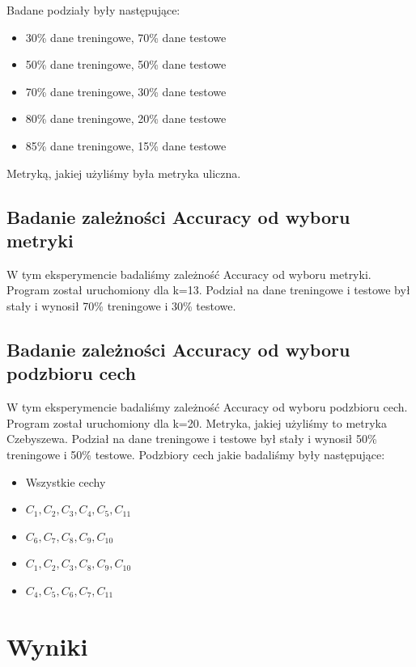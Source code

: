 \documentclass{classrep}
\begin{document}
Badane podziały były następujące:
\begin{itemize}
	\item 30\% dane treningowe, 70\% dane testowe
	\item 50\% dane treningowe, 50\% dane testowe
	\item 70\% dane treningowe, 30\% dane testowe
	\item 80\% dane treningowe, 20\% dane testowe
	\item 85\% dane treningowe, 15\% dane testowe
\end{itemize}

Metryką, jakiej użyliśmy była metryka uliczna.

\subsection{Badanie zależności Accuracy od wyboru metryki}

W tym eksperymencie badaliśmy zależność Accuracy od wyboru metryki. Program został uruchomiony dla k=13. Podział na dane treningowe i testowe był stały i wynosił 70\% treningowe i 30\% testowe.

\subsection{Badanie zależności Accuracy od wyboru podzbioru cech}

W tym eksperymencie badaliśmy zależność Accuracy od wyboru podzbioru cech. Program został uruchomiony dla k=20. Metryka, jakiej użyliśmy to metryka Czebyszewa. Podział na dane treningowe i testowe był stały i wynosił 50\% treningowe i 50\% testowe. Podzbiory cech jakie badaliśmy były następujące:
\begin{itemize}
	\item Wszystkie cechy
	\item $C_1, C_2, C_3, C_4, C_5, C_{11}$
	\item $C_6, C_7, C_8, C_9, C_{10}$ 
	\item $C_1, C_2, C_3, C_8, C_9, C_{10}$
	\item $C_4, C_5, C_6, C_7, C_{11}$
\end{itemize}


\section{Wyniki} %
\end{document}
